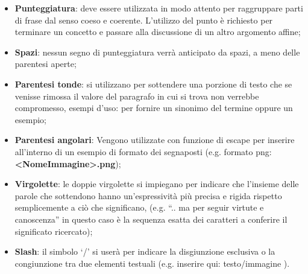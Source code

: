                 \begin{itemize}
                    \item\textbf{Punteggiatura}: deve essere utilizzata in modo attento per raggruppare parti di frase dal senso coeso e coerente. L’utilizzo del punto è richiesto per terminare un concetto e passare alla discussione di un altro argomento affine;
                    \item\textbf{Spazi}: nessun segno di punteggiatura verrà anticipato da spazi, a meno delle parentesi aperte;
                    \item\textbf{Parentesi tonde}: si utilizzano per sottendere una porzione di testo che se venisse rimossa il valore del paragrafo in cui si trova non verrebbe compromesso, esempi d’uso: per fornire un sinonimo del termine oppure un esempio;
                    \item\textbf{Parentesi angolari}: Vengono utilizzate con funzione di escape per inserire all’interno di un esempio di formato dei segnaposti (e.g. formato png: \textbf{<NomeImmagine>.png});
                    \item\textbf{Virgolette}: le doppie virgolette si impiegano per indicare che l’insieme delle parole che sottendono hanno un’espressività più precisa e rigida rispetto semplicemente a ciò che significano, (e.g. “.. ma per seguir virtute e canoscenza” in questo caso è la sequenza esatta dei caratteri a conferire il significato ricercato);
                    \item\textbf{Slash}: il simbolo ‘/’ si userà per indicare la disgiunzione esclusiva o la congiunzione tra due elementi testuali (e.g. inserire qui: testo/immagine ).
                \end{itemize}
